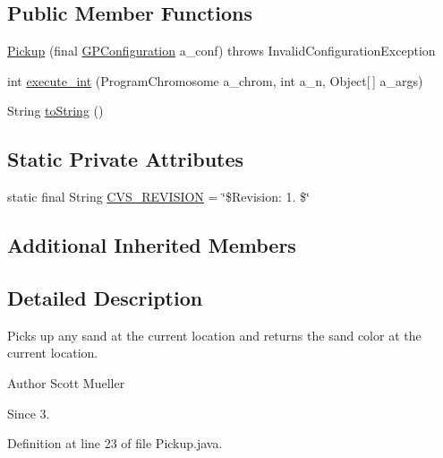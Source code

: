 \subsection*{Public Member Functions}
\begin{DoxyCompactItemize}
\item 
\hyperlink{classexamples_1_1gp_1_1painted_desert_1_1_pickup_a94f9c7424df0b9231d214cc1029f4714}{Pickup} (final \hyperlink{classorg_1_1jgap_1_1gp_1_1impl_1_1_g_p_configuration}{G\-P\-Configuration} a\-\_\-conf)  throws Invalid\-Configuration\-Exception 
\item 
int \hyperlink{classexamples_1_1gp_1_1painted_desert_1_1_pickup_a9bcb691938cdebd7084dbbd0fe5dc4e3}{execute\-\_\-int} (Program\-Chromosome a\-\_\-chrom, int a\-\_\-n, Object\mbox{[}$\,$\mbox{]} a\-\_\-args)
\item 
String \hyperlink{classexamples_1_1gp_1_1painted_desert_1_1_pickup_a0a0b644661d84e6d2f5524eca2ef16d2}{to\-String} ()
\end{DoxyCompactItemize}
\subsection*{Static Private Attributes}
\begin{DoxyCompactItemize}
\item 
static final String \hyperlink{classexamples_1_1gp_1_1painted_desert_1_1_pickup_a858e1accf3e22b22408daab8496a23dc}{C\-V\-S\-\_\-\-R\-E\-V\-I\-S\-I\-O\-N} = \char`\"{}\$Revision\-: 1. \$\char`\"{}
\end{DoxyCompactItemize}
\subsection*{Additional Inherited Members}


\subsection{Detailed Description}
Picks up any sand at the current location and returns the sand color at the current location.

\begin{DoxyAuthor}{Author}
Scott Mueller 
\end{DoxyAuthor}
\begin{DoxySince}{Since}
3. 
\end{DoxySince}


Definition at line 23 of file Pickup.\-java.



